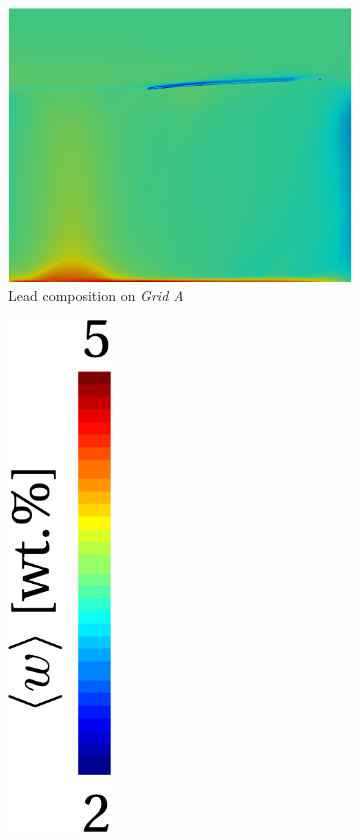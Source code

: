 \begin{figure}[htbp]
\centering
  \begin{subfigure}[t]{0.4\textwidth}
    \centering
  \includegraphics[width=\textwidth]{Chapter5/Graphics/2d/1700s_compo.png}
  \caption{Lead composition on \emph{Grid A}}
    \label{fig:1700s_compo}
  \end{subfigure}
  \begin{subfigure}[t]{0.15\textwidth}
    \centering
  \includegraphics[width=0.3\textwidth]{Chapter5/Graphics/2d/colorbar.pdf}

\end{subfigure}
\end{figure}
